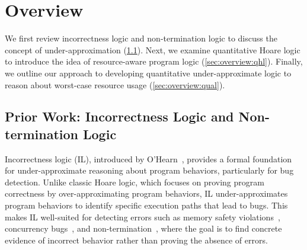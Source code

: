 \section{Overview}
\label{sec:overview}



We first review incorrectness logic and non-termination logic to discuss the concept of under-approximation (\cref{sec:overview:il}).
%
Next, we examine quantitative Hoare logic to introduce the idea of resource-aware program logic (\cref{sec:overview:qhl}).
%
Finally, we outline our approach to developing quantitative under-approximate logic to reason about worst-case resource usage (\cref{sec:overview:qual}).

\subsection{Prior Work: Incorrectness Logic and Non-termination Logic}
\label{sec:overview:il}

Incorrectness logic (IL), introduced by O'Hearn~\cite{POPL:OHearn20}, provides a formal foundation for under-approximate reasoning about program behaviors, particularly for bug detection.
%
Unlike classic Hoare logic, which focuses on proving program correctness by over-approximating program behaviors, IL under-approximates program behaviors to identify specific execution paths that lead to bugs.
%
This makes IL well-suited for detecting errors such as memory safety violations~\cite{CAV:RBD20}, concurrency bugs~\cite{POPL:RBD22}, and non-termination~\cite{OOPSLA:RVO24}, where the goal is to find concrete evidence of incorrect behavior rather than proving the absence of errors.

